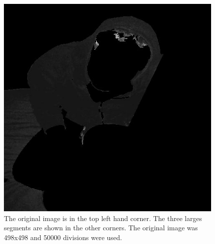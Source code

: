\begin{figure}[ht]
\begin{minipage}[b]{0.47\linewidth}
\end{minipage}
\hspace{0.5cm}
\begin{minipage}[b]{0.47\linewidth}
\centering
\includegraphics[width=\textwidth]{MSTseg4.jpg}
\end{minipage}
\caption{The original image is in the top left hand corner. The three larges segments are shown in the other corners. The original image was 498x498 and 50000 divisions were used.}
\end{figure}
\vfill 
